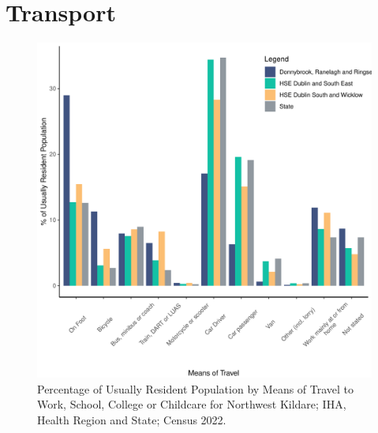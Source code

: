 \documentclass{article}
\begin{document}
\section{Transport}\label{sect:Trans}
\begin{figure}[H]
	\centering
	\includegraphics[width = 120mm]{../figures/TravelED.pdf}
	\caption{Percentage of Usually Resident Population by Means of Travel to Work, School, College or Childcare for Northwest Kildare; IHA, Health Region and State; Census 2022.}
	\label{fig:vbnv}
	\end{figure}
\end{document}
